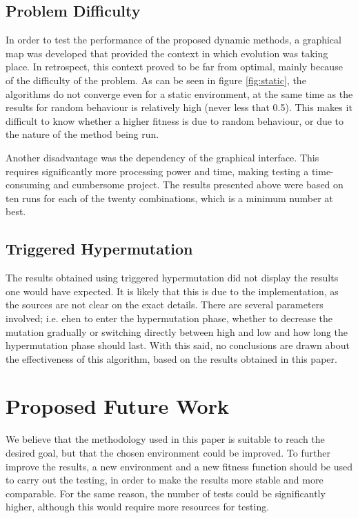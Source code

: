\documentclass[a4paper,12pt]{article}
\begin{document}
\subsection{Problem Difficulty}
In order to test the performance of the proposed dynamic methods, a graphical map was developed that provided the context in which evolution was taking place. In retrospect, this context proved to be far from optimal, mainly because of the difficulty of the problem. As can be seen in figure \ref{fig:static}, the algorithms do not converge even for a static environment, at the same time as the results for random behaviour is relatively high (never less that 0.5). This makes it difficult to know whether a higher fitness is due to random behaviour, or due to the nature of the method being run.

Another disadvantage was the dependency of the graphical interface. This requires significantly more processing power and time, making testing a time-consuming and cumbersome project. The results presented above were based on ten runs for each of the twenty combinations, which is a minimum number at best.

\subsection{Triggered Hypermutation}
The results obtained using triggered hypermutation did not display the results one would have expected. It is likely that this is due to the implementation, as the sources are not clear on the exact details. There are several parameters involved; i.e. ehen to enter the hypermutation phase, whether to decrease the mutation gradually or switching directly between high and low and how long the hypermutation phase should last. With this said, no conclusions are drawn about the effectiveness of this algorithm, based on the results obtained in this paper.

\section{Proposed Future Work}
We believe that the methodology used in this paper is suitable to reach the desired goal, but that the chosen environment could be improved. To further improve the results, a new environment and a new fitness function should be used to carry out the testing, in order to make the results more stable and more comparable. For the same reason, the number of tests could be significantly higher, although this would require more resources for testing.
\end{document}
